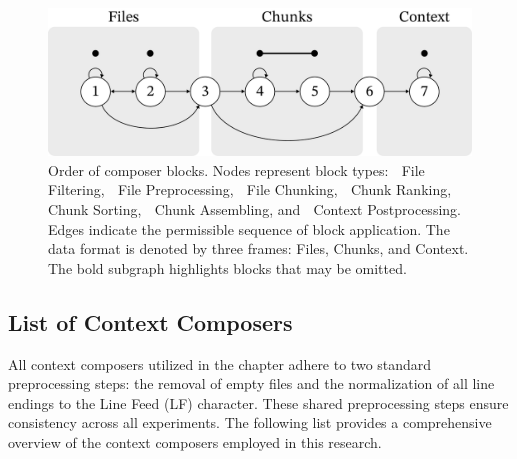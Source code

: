 \begin{figure}[ht]
    \centering
    \includegraphics[width=\textwidth]{figures/composer-blocks.pdf}
    \caption{Order of composer blocks. Nodes represent block types: \textcircled{} File Filtering, \textcircled{} File Preprocessing, \textcircled{} File Chunking, \textcircled{} Chunk Ranking, \textcircled{} Chunk Sorting, \textcircled{} Chunk Assembling, and \textcircled{} Context Postprocessing. Edges indicate the permissible sequence of block application. The data format is denoted by three frames: Files, Chunks, and Context. The bold subgraph highlights blocks that may be omitted.}\label{fig:composer-blocks}
\end{figure}

\subsection{List of Context Composers}

All context composers utilized in the  chapter adhere to two standard preprocessing steps: the removal of empty files and the normalization of all line endings to the Line Feed (LF) character. These shared preprocessing steps ensure consistency across all experiments. The following list provides a comprehensive overview of the context composers employed in this research.

